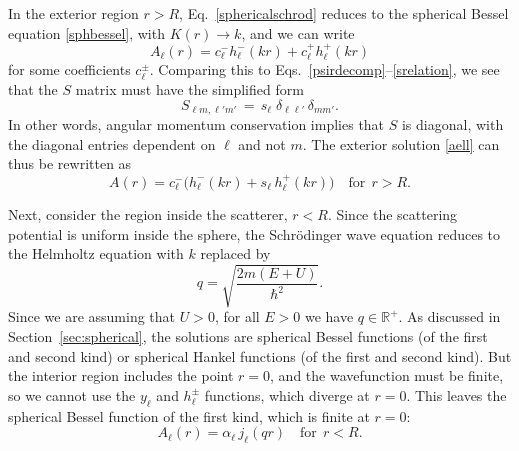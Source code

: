 \documentclass[pra,12pt]{revtex4-2}
\begin{document}
In the exterior region $r > R$, Eq.~\eqref{sphericalschrod} reduces to
the spherical Bessel equation \eqref{sphbessel}, with $K(r)
\rightarrow k$, and we can write
\begin{equation}
  A_{\ell}(r) = c^-_\ell h^-_\ell(kr) + c^+_\ell h^+_\ell(kr)
  \label{aell}
\end{equation}
for some coefficients $c^\pm_\ell$.  Comparing this to
Eqs.~\eqref{psirdecomp}--\eqref{srelation}, we see that the $S$ matrix
must have the simplified form
\begin{equation}
  S_{\ell m, \ell' m'} \,=\, s_{\ell} \; \delta_{\ell \ell'} \, \delta_{mm'}.
\end{equation}
In other words, angular momentum conservation implies that $S$ is
diagonal, with the diagonal entries dependent on $\ell$ and not $m$.
The exterior solution \eqref{aell} can thus be rewritten as
\begin{equation}
  A(r) = c^-_\ell \Big(h^-_\ell(kr) + s_\ell\, h^+_\ell(kr)\Big)
  \quad \textrm{for}\,\;r > R.
  \label{Aoutside}
\end{equation}

Next, consider the region inside the scatterer, $r < R$.  Since the
scattering potential is uniform inside the sphere, the Schr\"odinger
wave equation reduces to the Helmholtz equation with $k$ replaced by
\begin{equation}
  q = \sqrt{\frac{2m(E+U)}{\hbar^2}}.
\end{equation}
Since we are assuming that $U > 0$, for all $E > 0$ we have $q \in
\mathbb{R}^+$.  As discussed in Section~\ref{sec:spherical}, the
solutions are spherical Bessel functions (of the first and second
kind) or spherical Hankel functions (of the first and second kind).
But the interior region includes the point $r = 0$, and the
wavefunction must be finite, so we cannot use the $y_\ell$ and
$h_\ell^\pm$ functions, which diverge at $r = 0$.  This leaves the
spherical Bessel function of the first kind, which is finite at $r =
0$:
\begin{equation}
  A_{\ell}(r) = \alpha_\ell \, j_\ell(qr)
  \quad \textrm{for}\,\;r < R.
  \label{Ainside}
\end{equation}
\end{document}
